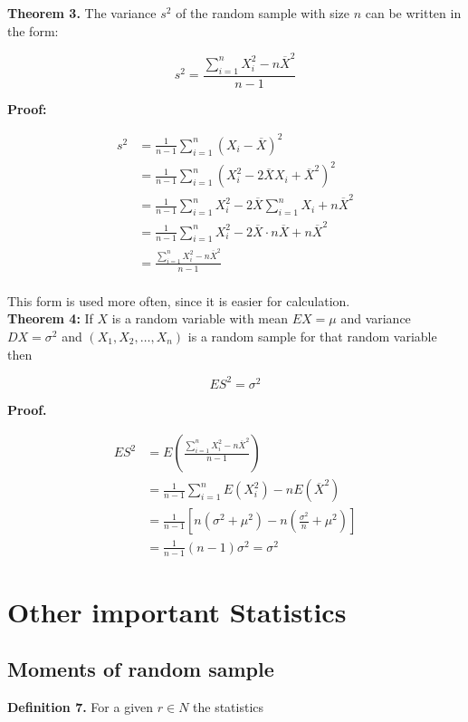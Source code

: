 \documentclass[a4paper, 12pt]{article}
\begin{document}
\textbf{Theorem 3.} The variance $s^2$ of the random sample with size $n$ can be written in the form:

\[ s^2 = \frac{\sum_{i=1}^{n} X_i^2-n\overline{X}^2}{n-1} \]

\textbf{Proof:}

\begin{align*}
  s^2 &=  \frac{1}{n-1}\sum_{i=1}^{n}(X_i - \overline{X})^2\\
  &= \frac{1}{n-1}\sum_{i=1}^{n}( X_i^2 - 2\overline{X}X_i + \overline{X}^2 )^2 \\
  &= \frac{1}{n-1}\sum_{i=1}^{n}X_i^2 - 2\overline{X}\sum_{i=1}^{n}X_i+n\overline{X}^2 \\
  &= \frac{1}{n-1}\sum_{i=1}^{n}X_i^2-2\overline{X}\cdot n\overline{X}+n\overline{X}^2 \\
  &=  \frac{\sum_{i=1}^{n} X_i^2-n\overline{X}^2}{n-1}\\
\end{align*}

This form is used more often, since it is easier for calculation.\\

\textbf{Theorem 4:} If $X$ is a random variable with mean $EX=\mu$ and variance $DX=\sigma^2$ and $\left( X_1,X_2,\dots,X_n \right)$ is a random sample for that random variable then

\[ ES^2=\sigma^2 \]

\textbf{Proof.}

\begin{align*}
  ES^2 &= E\left( \frac{\sum_{i=1}^{n} X_i^2-n\overline{X}^2}{n-1} \right) \\
  &= \frac{1}{n-1} \sum_{i=1}^{n} E(X_i^2)-nE(\overline{X}^2) \\
  &= \frac{1}{n-1} [ n(\sigma^2+\mu^2) - n(\frac{\sigma^2}{n}+\mu^2) ] \\
  &= \frac{1}{n-1} (n-1)\sigma^2=\sigma^2
\end{align*}


\newpage
\section{Other important Statistics}

\subsection{Moments of random sample}

\textbf{Definition 7.} For a given $r\in N$ the statistics
\end{document}
